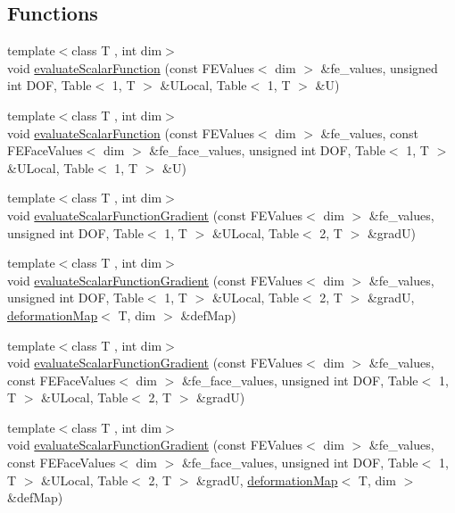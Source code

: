 \subsection*{Functions}
\begin{DoxyCompactItemize}
\item 
{\footnotesize template$<$class T , int dim$>$ }\\void \hyperlink{group___evaluation_functions_ga399ae2353249293211c021848a64175c}{evaluate\-Scalar\-Function} (const F\-E\-Values$<$ dim $>$ \&fe\-\_\-values, unsigned int D\-O\-F, Table$<$ 1, T $>$ \&U\-Local, Table$<$ 1, T $>$ \&U)
\item 
{\footnotesize template$<$class T , int dim$>$ }\\void \hyperlink{group___evaluation_functions_ga2e2fbeb2173113c6889c73bbb7304789}{evaluate\-Scalar\-Function} (const F\-E\-Values$<$ dim $>$ \&fe\-\_\-values, const F\-E\-Face\-Values$<$ dim $>$ \&fe\-\_\-face\-\_\-values, unsigned int D\-O\-F, Table$<$ 1, T $>$ \&U\-Local, Table$<$ 1, T $>$ \&U)
\item 
{\footnotesize template$<$class T , int dim$>$ }\\void \hyperlink{group___evaluation_functions_ga3ee6127c2c5c8333bb7fb384dcdb431f}{evaluate\-Scalar\-Function\-Gradient} (const F\-E\-Values$<$ dim $>$ \&fe\-\_\-values, unsigned int D\-O\-F, Table$<$ 1, T $>$ \&U\-Local, Table$<$ 2, T $>$ \&grad\-U)
\item 
{\footnotesize template$<$class T , int dim$>$ }\\void \hyperlink{group___evaluation_functions_gabeb71201e8213a7c7616cd8824617f73}{evaluate\-Scalar\-Function\-Gradient} (const F\-E\-Values$<$ dim $>$ \&fe\-\_\-values, unsigned int D\-O\-F, Table$<$ 1, T $>$ \&U\-Local, Table$<$ 2, T $>$ \&grad\-U, \hyperlink{structdeformation_map}{deformation\-Map}$<$ T, dim $>$ \&def\-Map)
\item 
{\footnotesize template$<$class T , int dim$>$ }\\void \hyperlink{group___evaluation_functions_ga4622566d0fe19b017cf8d2643ffeb47a}{evaluate\-Scalar\-Function\-Gradient} (const F\-E\-Values$<$ dim $>$ \&fe\-\_\-values, const F\-E\-Face\-Values$<$ dim $>$ \&fe\-\_\-face\-\_\-values, unsigned int D\-O\-F, Table$<$ 1, T $>$ \&U\-Local, Table$<$ 2, T $>$ \&grad\-U)
\item 
{\footnotesize template$<$class T , int dim$>$ }\\void \hyperlink{group___evaluation_functions_gabedd4ae2841d2332ed0df0513b189e34}{evaluate\-Scalar\-Function\-Gradient} (const F\-E\-Values$<$ dim $>$ \&fe\-\_\-values, const F\-E\-Face\-Values$<$ dim $>$ \&fe\-\_\-face\-\_\-values, unsigned int D\-O\-F, Table$<$ 1, T $>$ \&U\-Local, Table$<$ 2, T $>$ \&grad\-U, \hyperlink{structdeformation_map}{deformation\-Map}$<$ T, dim $>$ \&def\-Map)

\end{DoxyCompactItemize}
